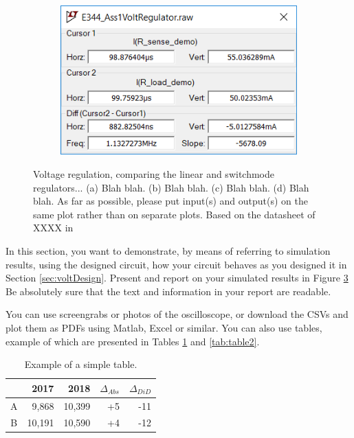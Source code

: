 \begin{figure}
\begin{subfigure}[]{0.55\textwidth}
		    \caption{} \label{subfig:pwr_simu_rect}
     \end{subfigure}
    \begin{subfigure}[]{0.4\textwidth}
              \centering
  		\includegraphics[width=1\linewidth]{./Figures/Screengrab2}
		    \caption{} \label{subfig:pwr_simu_rect}
     \end{subfigure}
   \caption[\textcolor{red}{I am the short caption that appears in the List of Figures list}]{Voltage regulation, comparing the linear and switchmode regulators... (a)  Blah blah. (b)  Blah blah.  (c)  Blah blah. (d) Blah blah.   As far as possible, please put input(s) and output(s) on the same plot rather than on separate plots. Based on the datasheet of XXXX in \cite{WebsiteOpAmp}}
    \label{fig:simulation_results_box}
 \end{figure}

In this section, you want to demonstrate, by means of referring to simulation results, using the designed circuit, how your circuit behaves as you designed it in Section \ref{sec:voltDesign}. Present and report on your simulated results in Figure \ref{fig:simulation_results_box} Be absolutely sure that the text and information in your report are readable. 

You can use screengrabs or photos of the oscilloscope, or download the CSVs and plot them as PDFs using Matlab, Excel or similar. 
You can also use tables, example of which are presented in Tables \ref{tab:table1} and \ref{tab:table2}.


\begin{table}
        \centering
        \footnotesize
        \caption{Example of a simple table.}
         \begin{tabular}{c@{\qquad}rrrr}
          \toprule
             & 2017 & 2018 & $\Delta_{Abs}$ & $\Delta_{DiD}$\\
          \midrule
          A & 9,868      & 10,399 & +5 & -11\\
          B & 10,191     & 10,590 & +4 & -12\\
          \bottomrule
        \end{tabular}
     \label{tab:table1}
\end{table}


